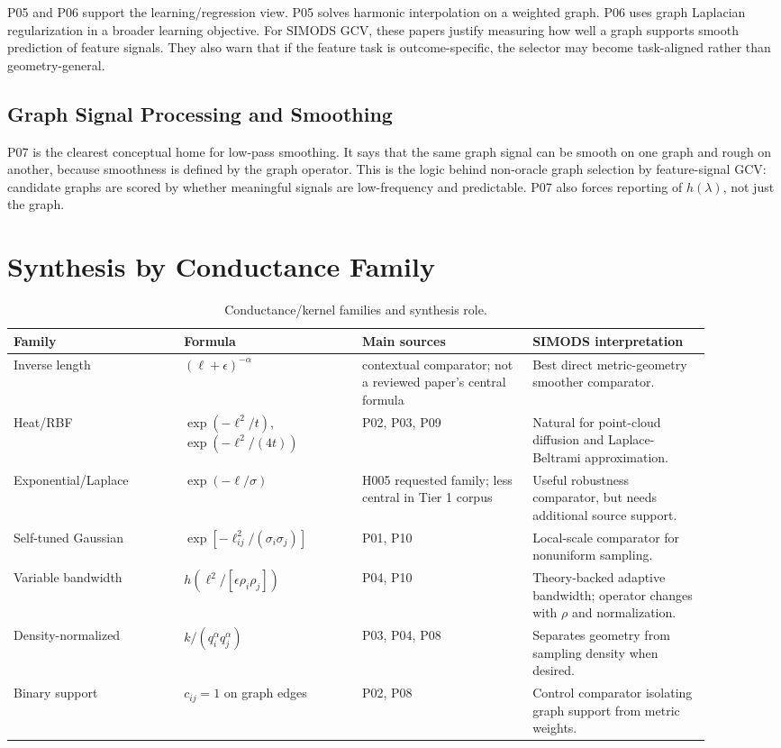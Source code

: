\documentclass[11pt]{article}
\begin{document}
P05 and P06 support the learning/regression view.  P05 solves harmonic
interpolation on a weighted graph.  P06 uses graph Laplacian regularization in
a broader learning objective.  For SIMODS GCV, these papers justify measuring
how well a graph supports smooth prediction of feature signals.  They also warn
that if the feature task is outcome-specific, the selector may become
task-aligned rather than geometry-general.

\subsection{Graph Signal Processing and Smoothing}

P07 is the clearest conceptual home for low-pass smoothing.  It says that the
same graph signal can be smooth on one graph and rough on another, because
smoothness is defined by the graph operator.  This is the logic behind
non-oracle graph selection by feature-signal GCV: candidate graphs are scored
by whether meaningful signals are low-frequency and predictable.  P07 also
forces reporting of \(h(\lambda)\), not just the graph.

\section{Synthesis by Conductance Family}

\begin{longtable}{p{0.22\linewidth}p{0.23\linewidth}p{0.22\linewidth}p{0.23\linewidth}}
\caption{Conductance/kernel families and synthesis role.}\\
\toprule
Family & Formula & Main sources & SIMODS interpretation\\
\midrule
\endhead
Inverse length &
\((\ell+\epsilon)^{-\alpha}\) &
contextual comparator; not a reviewed paper's central formula &
Best direct metric-geometry smoother comparator.\\
Heat/RBF &
\(\exp(-\ell^2/t)\), \(\exp(-\ell^2/(4t))\) &
P02, P03, P09 &
Natural for point-cloud diffusion and Laplace-Beltrami approximation.\\
Exponential/Laplace &
\(\exp(-\ell/\sigma)\) &
H005 requested family; less central in Tier 1 corpus &
Useful robustness comparator, but needs additional source support.\\
Self-tuned Gaussian &
\(\exp[-\ell_{ij}^2/(\sigma_i\sigma_j)]\) &
P01, P10 &
Local-scale comparator for nonuniform sampling.\\
Variable bandwidth &
\(h(\ell^2/[\epsilon\rho_i\rho_j])\) &
P04, P10 &
Theory-backed adaptive bandwidth; operator changes with \(\rho\) and normalization.\\
Density-normalized &
\(k/(q_i^\alpha q_j^\alpha)\) &
P03, P04, P08 &
Separates geometry from sampling density when desired.\\
Binary support &
\(c_{ij}=1\) on graph edges &
P02, P08 &
Control comparator isolating graph support from metric weights.\\
\bottomrule
\end{longtable}
\end{document}
